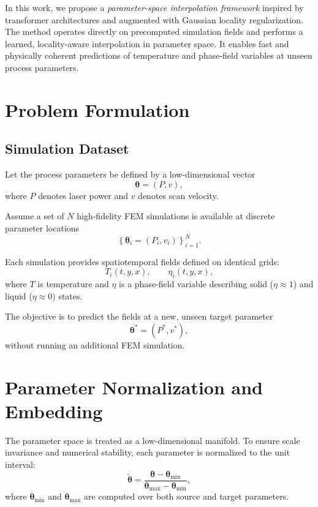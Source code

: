 \documentclass[10pt]{article}
\begin{document}
In this work, we propose a \emph{parameter-space interpolation framework} inspired by transformer architectures and augmented with Gaussian locality regularization. The method operates directly on precomputed simulation fields and performs a learned, locality-aware interpolation in parameter space. It enables fast and physically coherent predictions of temperature and phase-field variables at unseen process parameters.

\section{Problem Formulation}

\subsection{Simulation Dataset}

Let the process parameters be defined by a low-dimensional vector
\begin{equation}
\boldsymbol{\theta} = (P, v),
\end{equation}
where $P$ denotes laser power and $v$ denotes scan velocity.

Assume a set of $N$ high-fidelity FEM simulations is available at discrete parameter locations
\begin{equation}
\left\{ \boldsymbol{\theta}_i = (P_i, v_i) \right\}_{i=1}^{N}.
\end{equation}

Each simulation provides spatiotemporal fields defined on identical grids:
\begin{equation}
T_i(t,y,x), \qquad \eta_i(t,y,x),
\end{equation}
where $T$ is temperature and $\eta$ is a phase-field variable describing solid ($\eta \approx 1$) and liquid ($\eta \approx 0$) states.

The objective is to predict the fields at a new, unseen target parameter
\begin{equation}
\boldsymbol{\theta}^* = (P^*, v^*),
\end{equation}
without running an additional FEM simulation.

\section{Parameter Normalization and Embedding}

The parameter space is treated as a low-dimensional manifold. To ensure scale invariance and numerical stability, each parameter is normalized to the unit interval:
\begin{equation}
\tilde{\boldsymbol{\theta}} = 
\frac{\boldsymbol{\theta} - \boldsymbol{\theta}_{\min}}
{\boldsymbol{\theta}_{\max} - \boldsymbol{\theta}_{\min}},
\end{equation}
where $\boldsymbol{\theta}_{\min}$ and $\boldsymbol{\theta}_{\max}$ are computed over both source and target parameters.
\end{document}
